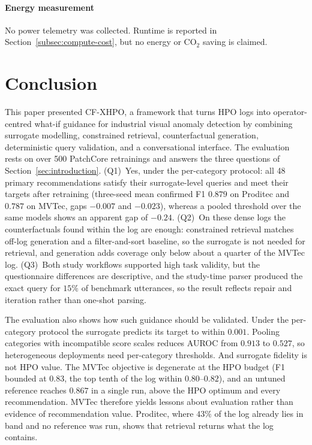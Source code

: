 \documentclass[final,5p,times,twocolumn]{elsarticle}
\begin{document}
\paragraph{Energy measurement}
No power telemetry was collected. Runtime is reported in
Section~\ref{subsec:compute-cost}, but no energy or CO$_2$ saving is
claimed.

\section{Conclusion}
\label{sec:conclusion}

This paper presented CF-XHPO, a framework that turns HPO logs into
operator-centred what-if guidance for industrial visual anomaly
detection by combining surrogate modelling, constrained retrieval,
counterfactual generation, deterministic query validation, and a
conversational interface. The evaluation rests on over 500 PatchCore retrainings and answers the three questions of Section~\ref{sec:introduction}. (Q1)~Yes, under the per-category protocol: all 48 primary recommendations satisfy their surrogate-level queries and meet their targets after retraining (three-seed mean confirmed F1 $0.879$ on Proditec and $0.787$ on MVTec, gaps $-0.007$ and $-0.023$), whereas a pooled threshold over the same models shows an apparent gap of $-0.24$. (Q2)~On these dense logs the counterfactuals found within the log are enough: constrained retrieval matches off-log generation and a filter-and-sort baseline, so the surrogate is not needed for retrieval, and generation adds coverage only below about a quarter of the MVTec log. (Q3)~Both study workflows supported high task validity, but the questionnaire differences are descriptive, and the study-time parser produced the exact query for $15\%$ of benchmark utterances, so the result reflects repair and iteration rather than one-shot parsing.

The evaluation also shows how such guidance should be validated. Under the per-category protocol the surrogate predicts its target to within $0.001$. Pooling categories with incompatible score scales reduces AUROC from $0.913$ to $0.527$, so heterogeneous
deployments need per-category thresholds. And surrogate fidelity is not HPO value. The MVTec objective is degenerate at the HPO budget (F1 bounded at $0.83$, the top tenth of the log within $0.80$--$0.82$), and an untuned reference reaches $0.867$ in a single run, above the HPO optimum and every recommendation. MVTec therefore yields lessons about evaluation rather than evidence of recommendation value. Proditec, where $43\%$ of the log already lies in band and no reference was run, shows that retrieval returns what the log contains.
\end{document}
